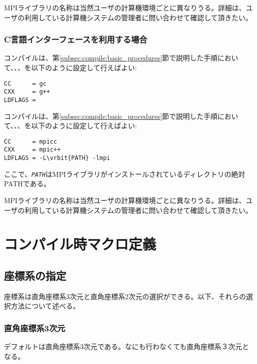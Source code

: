 MPIライブラリの名称は当然ユーザの計算機環境ごとに異なりうる。詳細は、ユーザの利用している計算機システムの管理者に問い合わせて確認して頂きたい。

\subsubsection{C言語インターフェースを利用する場合}
コンパイルは、第\ref{subsec:compile:basic_procedures}節で説明した手順において、、、を以下のように設定して行えばよい:
\begin{screen}
\begin{verbatim}
CC      = gc
CXX     = g++
LDFLAGS = 
\end{verbatim}  
\end{screen}

コンパイルは、第\ref{subsec:compile:basic_procedures}節で説明した手順において、、、を以下のように設定して行えばよい:
\begin{screen}
\begin{Verbatim}[commandchars=\\\{\}]
CC      = mpicc 
CXX     = mpic++
LDFLAGS = -L\vrbit{PATH} -lmpi 
\end{Verbatim}  
\end{screen}
ここで、\textit{\texttt{PATH}}はMPIライブラリがインストールされているディレクトリの絶対PATHである。

MPIライブラリの名称は当然ユーザの計算機環境ごとに異なりうる。詳細は、ユーザの利用している計算機システムの管理者に問い合わせて確認して頂きたい。
\clearpage

\section{コンパイル時マクロ定義}
\label{sec:macro_definition_at_compling}

\subsection{座標系の指定}
\label{subsec:macro_coordinate}
座標系は直角座標系3次元と直角座標系2次元の選択ができる。以下、それらの選択方法について述べる。

\subsubsection{直角座標系3次元}
デフォルトは直角座標系3次元である。なにも行わなくても直角座標系３次元となる。

